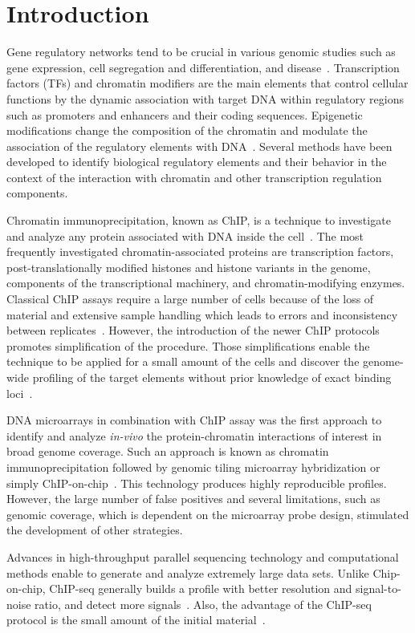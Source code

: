 \chapter*{Introduction}

Gene regulatory networks tend to be crucial in various genomic studies such as gene expression, cell segregation and differentiation, and disease~\cite{collas2010current}. 
Transcription factors (TFs) and chromatin modifiers are the main elements that control cellular functions by the dynamic association with target DNA within regulatory regions such as promoters and enhancers and their coding sequences.
Epigenetic modifications change the composition of the chromatin and modulate the association of the regulatory elements with DNA~\cite{antequera2003structure, kouzarides2007chromatin, mito2007histone}.
Several methods have been developed to identify biological regulatory elements and their behavior in the context of the interaction with chromatin and other transcription regulation components. 

Chromatin immunoprecipitation, known as ChIP, is a technique to investigate and analyze any protein associated with DNA inside the cell~\cite{o1995histone, o1996immunoprecipitation, nelson2006protocol}.
The most frequently investigated chromatin-associated proteins are transcription factors, post-translationally modified histones and histone variants in the genome, components of the transcriptional machinery, and chromatin-modifying enzymes.
Classical ChIP assays require a large number of cells because of the loss of material and extensive sample handling which leads to errors and inconsistency between replicates~\cite{o1996immunoprecipitation}. 
However, the introduction of the newer ChIP protocols promotes simplification of the procedure. 
Those simplifications enable the technique to be applied for a small amount of the cells and discover the genome-wide profiling of the target elements without prior knowledge of exact binding loci~\cite{collas2010current}. 

DNA microarrays in combination with ChIP assay was the first approach to identify and analyze \textit{in-vivo} the protein-chromatin interactions of interest in broad genome coverage. 
Such an approach is known as chromatin immunoprecipitation followed by genomic tiling microarray hybridization or simply ChIP-on-chip~\cite{ren2000genome, loden2005whole}. 
This technology produces highly reproducible profiles.
However, the large number of false positives and several limitations, such as genomic coverage, which is dependent on the microarray probe design, stimulated the development of other strategies. 

Advances in high-throughput parallel sequencing technology and computational methods enable to generate and analyze extremely large data sets. 
Unlike Chip-on-chip, ChIP-seq generally builds a profile with better resolution and signal-to-noise ratio, and detect more signals~\cite{park2009chip}.
Also, the advantage of the ChIP-seq protocol is the small amount of the initial material~\cite{adli2010genome}.